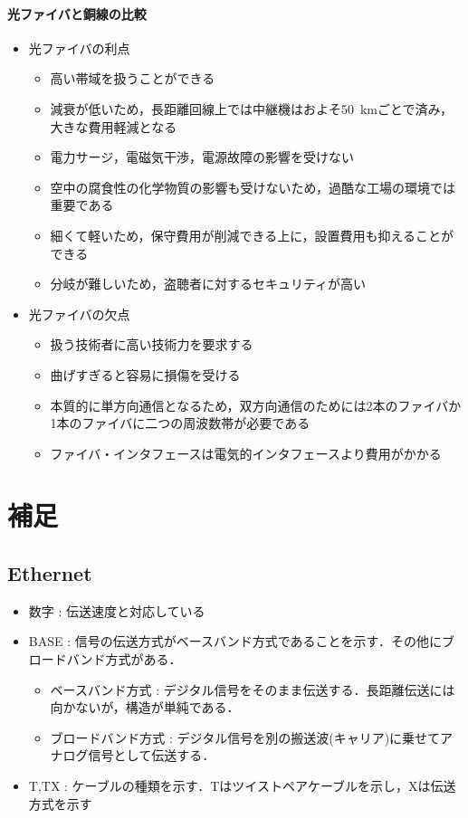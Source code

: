 \documentclass[a4paper]{ltjsarticle}
\begin{document}
			\paragraph{光ファイバと銅線の比較}
				\begin{itemize}
					\item 光ファイバの利点
					\begin{itemize}
						\item 高い帯域を扱うことができる
						\item 減衰が低いため，長距離回線上では中継機はおよそ\SI{50}{km}ごとで済み，大きな費用軽減となる
						\item 電力サージ，電磁気干渉，電源故障の影響を受けない
						\item 空中の腐食性の化学物質の影響も受けないため，過酷な工場の環境では重要である
						\item 細くて軽いため，保守費用が削減できる上に，設置費用も抑えることができる
						\item 分岐が難しいため，盗聴者に対するセキュリティが高い
					\end{itemize}
					\item 光ファイバの欠点
					\begin{itemize}
						\item 扱う技術者に高い技術力を要求する
						\item 曲げすぎると容易に損傷を受ける
						\item 本質的に単方向通信となるため，双方向通信のためには2本のファイバか1本のファイバに二つの周波数帯が必要である
						\item ファイバ・インタフェースは電気的インタフェースより費用がかかる
					\end{itemize}
				\end{itemize}

\section{補足}
	\subsection{Ethernet}
		\begin{itemize}
			\item 数字 : 伝送速度と対応している
			\item BASE : 信号の伝送方式がベースバンド方式であることを示す．その他にブロードバンド方式がある．
			\begin{itemize}
				\item ベースバンド方式 : デジタル信号をそのまま伝送する．長距離伝送には向かないが，構造が単純である．
				\item ブロードバンド方式 : デジタル信号を別の搬送波(キャリア)に乗せてアナログ信号として伝送する．
			\end{itemize}
			\item T,TX : ケーブルの種類を示す．Tはツイストペアケーブルを示し，Xは伝送方式を示す
		\end{itemize}
\end{document}
